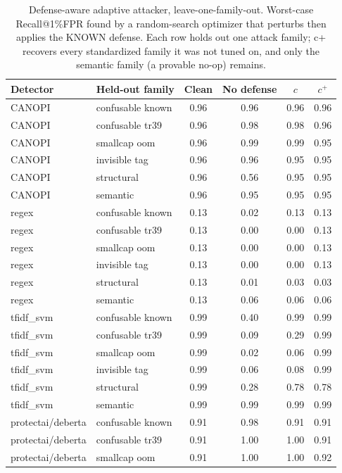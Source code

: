 \begin{table}[ht]\centering
\caption{Defense-aware adaptive attacker, leave-one-family-out. Worst-case Recall@1\%FPR found by a random-search optimizer that perturbs then applies the KNOWN defense. Each row holds out one attack family; c+ recovers every standardized family it was not tuned on, and only the semantic family (a provable no-op) remains.}
\label{tab:adaptive_v2}
\small
\begin{tabular}{ll cccc}
\toprule
Detector & Held-out family & Clean & No defense & $c$ & $c^{+}$ \\
\midrule
CANOPI & confusable known & 0.96 & 0.96 & 0.96 & 0.96 \\
CANOPI & confusable tr39 & 0.96 & 0.98 & 0.98 & 0.96 \\
CANOPI & smallcap oom & 0.96 & 0.99 & 0.99 & 0.95 \\
CANOPI & invisible tag & 0.96 & 0.96 & 0.95 & 0.95 \\
CANOPI & structural & 0.96 & 0.56 & 0.95 & 0.95 \\
CANOPI & semantic & 0.96 & 0.95 & 0.95 & 0.95 \\
regex & confusable known & 0.13 & 0.02 & 0.13 & 0.13 \\
regex & confusable tr39 & 0.13 & 0.00 & 0.00 & 0.13 \\
regex & smallcap oom & 0.13 & 0.00 & 0.00 & 0.13 \\
regex & invisible tag & 0.13 & 0.00 & 0.00 & 0.13 \\
regex & structural & 0.13 & 0.01 & 0.03 & 0.03 \\
regex & semantic & 0.13 & 0.06 & 0.06 & 0.06 \\
tfidf_svm & confusable known & 0.99 & 0.40 & 0.99 & 0.99 \\
tfidf_svm & confusable tr39 & 0.99 & 0.09 & 0.29 & 0.99 \\
tfidf_svm & smallcap oom & 0.99 & 0.02 & 0.06 & 0.99 \\
tfidf_svm & invisible tag & 0.99 & 0.06 & 0.08 & 0.99 \\
tfidf_svm & structural & 0.99 & 0.28 & 0.78 & 0.78 \\
tfidf_svm & semantic & 0.99 & 0.99 & 0.99 & 0.99 \\
protectai/deberta & confusable known & 0.91 & 0.98 & 0.91 & 0.91 \\
protectai/deberta & confusable tr39 & 0.91 & 1.00 & 1.00 & 0.91 \\
protectai/deberta & smallcap oom & 0.91 & 1.00 & 1.00 & 0.92 \\

\end{tabular}
\end{table}

